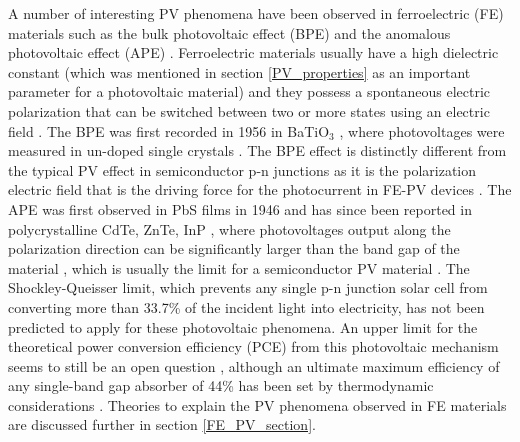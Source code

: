 A number of interesting PV phenomena have been observed in ferroelectric (FE) materials  such as the bulk photovoltaic effect (BPE) and the anomalous photovoltaic effect (APE) \cite{keith}. Ferroelectric materials usually have a high dielectric constant (which was mentioned in section \ref{PV_properties} as an important parameter for a photovoltaic material) and they possess a spontaneous electric polarization that can be switched between two or more states using an electric field \cite{new_FE_PV_1}.
The BPE was first recorded in 1956 in BaTiO$_3$ \cite{keith_46}, where photovoltages were measured in un-doped single crystals \cite{keith}.
The BPE effect is distinctly different from the typical PV effect in semiconductor
p-n junctions as it is the polarization electric field that is the driving force for the photocurrent in FE-PV devices \cite{FE_PV_rev1}. 
The APE was first observed in PbS films in 1946 \cite{keith_54} and has since been reported in polycrystalline CdTe, ZnTe, InP \cite{keith_55, keith_56, keith_57}, where photovoltages output along the polarization direction can be significantly larger than the band gap of the material \cite{FE_PV_rev1}, which is usually the limit for a semiconductor PV material \cite{keith}. 
The Shockley-Queisser limit, which prevents any single p-n junction solar cell from converting more than 33.7\% of the incident light into electricity, has not been predicted to apply for these photovoltaic phenomena. An upper limit for the theoretical power conversion efficiency (PCE) from this photovoltaic mechanism seems to still be an open question \cite{new_FE_PV}, although an ultimate maximum efficiency of any single-band gap absorber of 44\% has been set by thermodynamic considerations \cite{SQ_1961}. Theories to explain the PV phenomena observed in FE materials are discussed further in section \ref{FE_PV_section}.\\

